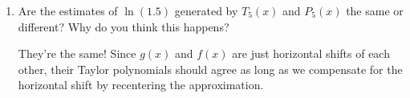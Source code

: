 \documentclass[10pt]{article}
\newenvironment{red}{\color{red}}{\ignorespacesafterend}
\begin{document}
\begin{enumerate}[leftmargin=0pt]
\begin{enumerate}
    \begin{red}
    Since $\ln(1.5) = g(1.5) \approx P_5(1.5)$, the estimate provided by $P_5(x)$ is $\ln(1.5) \approx P_5(1.5) = .40729166666\ldots$.
    \end{red}
    
    \item Are the estimates of $\ln(1.5)$ generated by $T_5(x)$ and $P_5(x)$ the same or different? Why do you think this happens?
    
    \begin{red}
    They're the same! Since $g(x)$ and $f(x)$ are just horizontal shifts of each other, their Taylor polynomials should agree as long as we compensate for the horizontal shift by recentering the approximation.
    \end{red}
\end{enumerate}

\end{enumerate}
\end{document}
